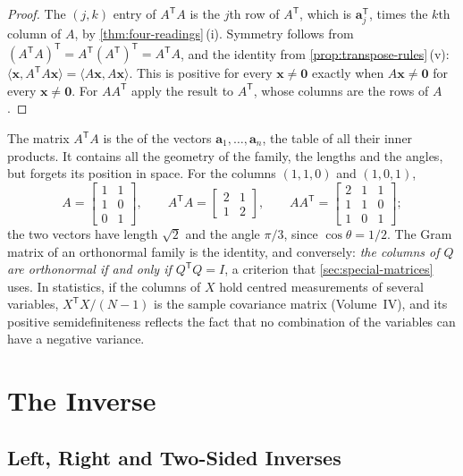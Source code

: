 \begin{proof}
The $(j,k)$ entry of $A^{\mathsf T}A$ is the $j$th row of $A^{\mathsf T}$, which is $\mathbf a_j^{\mathsf T}$, times the $k$th column of $A$, by \cref{thm:four-readings}\,(i). Symmetry follows from $(A^{\mathsf T}A)^{\mathsf T}=A^{\mathsf T}(A^{\mathsf T})^{\mathsf T}=A^{\mathsf T}A$, and the identity from \cref{prop:transpose-rules}\,(v): $\langle\mathbf x,A^{\mathsf T}A\mathbf x\rangle=\langle A\mathbf x,A\mathbf x\rangle$. This is positive for every $\mathbf x\ne\mathbf 0$ exactly when $A\mathbf x\ne\mathbf 0$ for every $\mathbf x\ne\mathbf 0$. For $AA^{\mathsf T}$ apply the result to $A^{\mathsf T}$, whose columns are the rows of $A$.
\end{proof}

The matrix $A^{\mathsf T}A$ is the  of the vectors $\mathbf a_1,\ldots,\mathbf a_n$, the table of all their inner products. It contains all the geometry of the family, the lengths and the angles, but forgets its position in space. For the columns $(1,1,0)$ and $(1,0,1)$,
\[
A=\begin{bmatrix}1&1\\1&0\\0&1\end{bmatrix},\qquad A^{\mathsf T}A=\begin{bmatrix}2&1\\1&2\end{bmatrix},\qquad AA^{\mathsf T}=\begin{bmatrix}2&1&1\\1&1&0\\1&0&1\end{bmatrix};
\]
the two vectors have length $\sqrt2$ and the angle $\pi/3$, since $\cos\theta=1/2$. The Gram matrix of an orthonormal family is the identity, and conversely: \emph{the columns of $Q$ are orthonormal if and only if $Q^{\mathsf T}Q=I$}, a criterion that \cref{sec:special-matrices} uses. In statistics, if the columns of $X$ hold centred measurements of several variables, $X^{\mathsf T}X/(N-1)$ is the sample covariance matrix (Volume~IV), and its positive semidefiniteness reflects the fact that no combination of the variables can have a negative variance.

\section{The Inverse}
\label{sec:inverse}

\subsection{Left, Right and Two-Sided Inverses}

